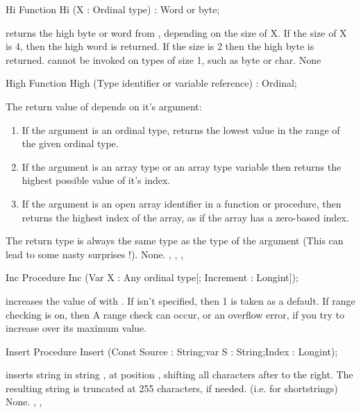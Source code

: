 \documentclass{report}
\begin{document}

\begin{function}{Hi}
\Declaration
Function Hi (X : Ordinal type) : Word or byte;

\Description
{} returns the high byte or word from , depending on the size
of X. If the size of X is 4, then the high word is returned. If the size is
2 then the high byte is returned.
 cannot be invoked on types of size 1, such as byte or char.
\Errors
None
\SeeAlso
{}
\end{function}


\begin{function}{High}
\Declaration
Function High (Type identifier or variable reference) : Ordinal;

\Description
 The return value of  depends on it's argument:
\begin{enumerate}
\item If the argument is an ordinal type,  returns the lowest
 value in the range of the given ordinal type.
\item If the argument is an array type or an array type variable then
 returns the highest possible value of it's index.
\item If the argument is an open array identifier in a function or
procedure, then  returns the highest index of the array, as if the
array has a zero-based index.
\end{enumerate}
The return type is always the same type as the type of the argument
(This can lead to some nasty surprises !).
\Errors
None.
\SeeAlso
{}, , , 
\end{function}


\begin{procedure}{Inc}
\Declaration
Procedure Inc (Var X : Any ordinal type[; Increment : Longint]);

\Description
{} increases the value of  with .
If  isn't specified, then 1 is taken as a default.
\Errors
If range checking is on, then A range check can occur, or an overflow 
error, if you try to increase  over its maximum value.
\SeeAlso
{}
\end{procedure}


\begin{procedure}{Insert}
\Declaration
Procedure Insert (Const Source : String;var S : String;Index : Longint);

\Description
{} inserts string  in string , at position
, shifting all characters after  to the right. The
resulting string is truncated at 255 characters, if needed. (i.e. for
shortstrings)
\Errors
None.
\SeeAlso
{}, , 
\end{procedure}
\end{document}
